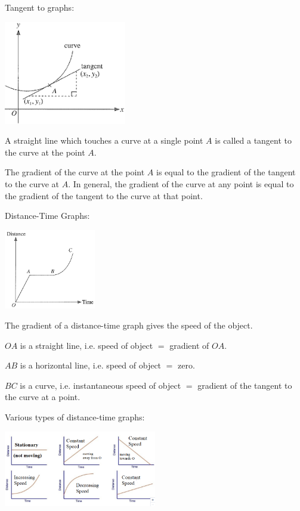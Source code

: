 \documentclass[twocolumn]{article}
\begin{document}
\begin{enumerate}
\bigskip 

\noindent 
Tangent to graphs:

\includegraphics[width=0.4\textwidth]{12.png}

\bigskip 

\noindent 
A straight line which touches a curve at a single point $A$ is called a tangent to the curve at the point $A$.

\bigskip 

\noindent 
The gradient of the curve at the point $A$ is equal to the gradient of the tangent to the curve at $A$. In general, the gradient of the curve at any point is equal to the gradient of the tangent to the curve at that point.

\bigskip 

\noindent 
Distance-Time Graphs:

\includegraphics[width=0.3\textwidth]{13.png}

\noindent 
The gradient of a distance-time graph gives the speed of the object.

\noindent 
$O A$ is a straight line, i.e. speed of object $=$ gradient of $O A$.

\noindent 
$A B$ is a horizontal line, i.e. speed of object $=$ zero.

\noindent 
$B C$ is a curve, i.e. instantaneous speed of object $=$ gradient of the tangent to the curve at a point.

\bigskip

\noindent
Various types of distance-time graphs:

\includegraphics[width=0.5\textwidth]{17.png}


\end{enumerate}
\end{document}
